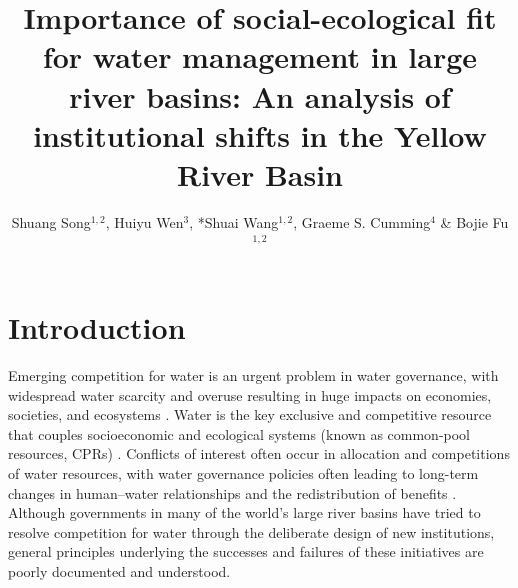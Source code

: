 \documentclass{article}
\title{Importance of social-ecological fit for water management in large river basins: An analysis of institutional shifts in the Yellow River Basin}
\author{Shuang Song$^{1,2}$, Huiyu Wen$^3$, *Shuai Wang$^{1,2}$, Graeme S. Cumming$^{4}$ \& Bojie Fu$^{1, 2}$}
\begin{document}
\maketitle


\begin{abstract}
    
\end{abstract}


\section{Introduction}
Emerging competition for water is an urgent problem in water governance, with widespread water scarcity and overuse resulting in huge impacts on economies, societies, and ecosystems \cite{gleickPeakwaterlimits2010,dolanEvaluatingeconomicimpact2021,siwiCompetitionWaterGetting,ziolkowskaCompetitionWaterResources2016,distefanoArewedeep2017}.
Water is the key exclusive and competitive resource that couples socioeconomic and ecological systems (known as common-pool resources, CPRs) \cite{wutichWaterScarcitySustainability2009,ostromGeneralFrameworkAnalyzing2009,castilla-rhoSocialtippingpoints2017,castilla-rhoGroundwaterCommonPool2020}.
Conflicts of interest often occur in allocation and competitions of water resources, with water governance policies often leading to long-term changes in human–water relationships and the redistribution of benefits \cite{wangAlignmentsocialecological2019,speedBasinwaterallocation2013,chingManagingsocioecologyvery2015}.
Although governments in many of the world’s large river basins have tried to resolve competition for water through the deliberate design of new institutions, general principles underlying the successes and failures of these initiatives are poorly documented and understood.
\end{document}
